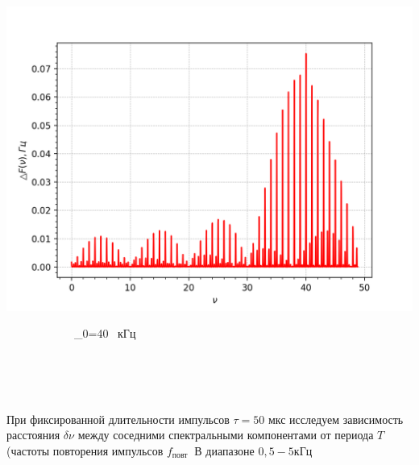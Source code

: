 \begin{minipage}{0.05\textwidth}
\begin{center}
\ \ \Rightarrow
\end{center}
\end{minipage}
\begin{minipage}{0.3\textwidth}
\includegraphics[width=\linewidth]{8.png}\\
\begin{center}
\ \ \ \ \ \ \ \ \ \ \ \ \nu_{0}=40 \ кГц
\end{center}
\end{minipage}


\\
\
\\
\

При фиксированной длительности импульсов $\tau=50$ мкс исследуем зависимость расстояния $\delta \nu$ между соседними спектральными компонентами от периода $T$ (частоты повторения импульсов $f_{\text {повт }}$ В диапазоне $0,5-5 кГц$

